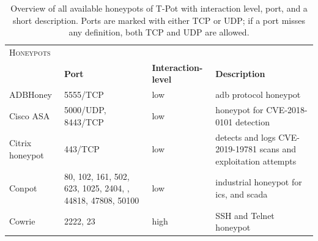 \begin{table}
    \centering
    \caption[Overview of honeypots of T-Pot]{
        Overview of all available honeypots of T-Pot with interaction level, port, and a short description.
        Ports are marked with either TCP or UDP; if a port misses any definition, both TCP and UDP are allowed.
    }
    \begin{tabularx}{\linewidth}{l|XlX}
        \toprule
        \textsc{Honeypots}                        & \multicolumn{3}{c}{}                                                                                                                                                                                                            \\
                                                  & \textbf{Port}                                                                                               & \textbf{Interaction-level} & \textbf{Description}                                                                 \\
        \hline
        ADBHoney \cite{adbhoney2021}              & 5555/TCP                                                                                                    & low                        & \ac{adb} protocol honeypot                                                           \\
        Cisco ASA \cite{cymmetria2018}            & 5000/UDP, 8443/TCP                                                                                          & low                        & honeypot for CVE-2018-0101\cite{CVE-2018-0101} detection                             \\
        Citrix honeypot \cite{citrixhoneypot2020} & 443/TCP                                                                                                     & low                        & detects and logs CVE-2019-19781\cite{CVE-2019-19781} scans and exploitation attempts \\
        Conpot \cite{conpot2021}                  & 80, 102, 161, 502, 623, 1025, 2404, \newline 10001, 44818, 47808, 50100                                     & low                        & industrial honeypot for \ac{ics}, and \ac{scada}                                     \\
        Cowrie \cite{cowrie2021}                  & 2222, 23                                                                                                    & high                       & SSH and Telnet honeypot                                                              \\

\end{tabularx}
\end{table}
